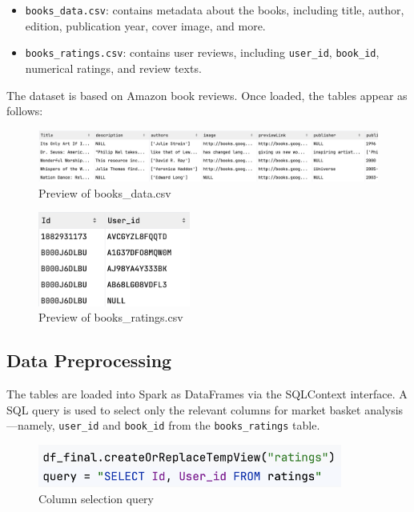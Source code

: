 \documentclass[a4paper,12pt]{article}
\begin{document}
\begin{itemize}
    \item \texttt{books\_data.csv}: contains metadata about the books, including title, author, edition, publication year, cover image, and more.
    \item \texttt{books\_ratings.csv}: contains user reviews, including \texttt{user\_id}, \texttt{book\_id}, numerical ratings, and review texts.
\end{itemize}

The dataset is based on Amazon book reviews. Once loaded, the tables appear as follows:

\begin{figure}[h]
    \centering
\includegraphics[width=15cm]{images/book_data.png}
    \caption{Preview of books\_data.csv}
\end{figure}
\begin{figure}[h]
    \centering
\includegraphics[width=5cm]{images/book_ratings.png}
    \caption{Preview of books\_ratings.csv}
\end{figure}

\subsection{Data Preprocessing}

The tables are loaded into Spark as DataFrames via the SQLContext interface. 
A SQL query is used to select only the relevant columns for market basket analysis—namely, \texttt{user\_id} and \texttt{book\_id} from the \texttt{books\_ratings} table.

\begin{figure}[h]
    \centering
    \includegraphics[width=10cm]{images/query.png}
    \caption{Column selection query}
\end{figure}
\end{document}
